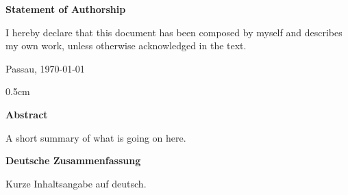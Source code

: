 \documentclass{thesisclass}
\begin{document}

\frontmatter
{}

\blankpage


\thispagestyle{plain}

\vspace*{\fill}

\centerline{\textbf{Statement of Authorship}}

\vspace{0.25cm}

I hereby declare that this document has been composed by myself and describes my own work, unless otherwise acknowledged in the text.

\vspace{2.5cm}

\hspace{0.25cm} Passau, \today

\vspace{2cm}

\blankpage


\thispagestyle{plain}

\begin{addmargin}{0.5cm}

\centerline{\textbf{Abstract}}

A short summary of what is going on here.

\vskip 2cm

\centerline{\textbf{Deutsche Zusammenfassung}}

Kurze Inhaltsangabe auf deutsch.

\end{addmargin}

\blankpage


\tableofcontents
\blankpage


\mainmatter
{}







\cleardoublepage
{}
{}

{}





\cleardoublepage

\end{document}
